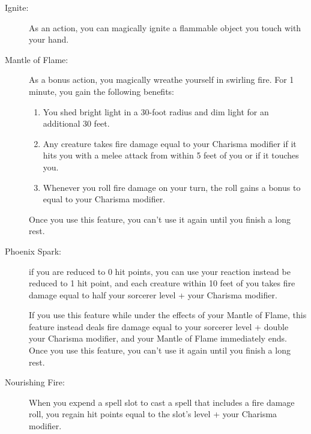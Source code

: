 \documentclass[letterpaper,10pt,twoside,twocolumn,openany]{book}
\begin{document}
\begin{description}
	\item[Ignite:] As an action, you can magically ignite a flammable object you touch with your hand. 
	\item[Mantle of Flame:] As a bonus action, you magically wreathe yourself in swirling fire. For 1 minute, you gain the following benefits:
	
	\begin{enumerate}
		\item You shed bright light in a 30-foot radius and dim light for an additional 30 feet.
		\item Any creature takes fire damage equal to your Charisma modifier if it hits you with a melee attack from within 5 feet of you or if it touches you.
		\item Whenever you roll fire damage on your turn, the roll gains a bonus to equal to your Charisma modifier. 
	\end{enumerate}
	
	Once you use this feature, you can't use it again until you finish a long rest. 
	\item[Phoenix Spark:]  if you are reduced to 0 hit points, you can use your reaction instead be reduced to 1 hit point, and each creature within 10 feet of you takes fire damage equal to half your sorcerer level + your Charisma modifier.
	
	If you use this feature while under the effects of your Mantle of Flame, this feature instead deals fire damage equal to your sorcerer level + double your Charisma modifier, and your Mantle of Flame immediately ends. Once you use this feature, you can't use it again until you finish a long rest. 
	\item[Nourishing Fire:] When you expend a spell slot to cast a spell that includes a fire damage roll, you regain hit points equal to the slot's level + your Charisma modifier. 
\end{description}
\end{document}
